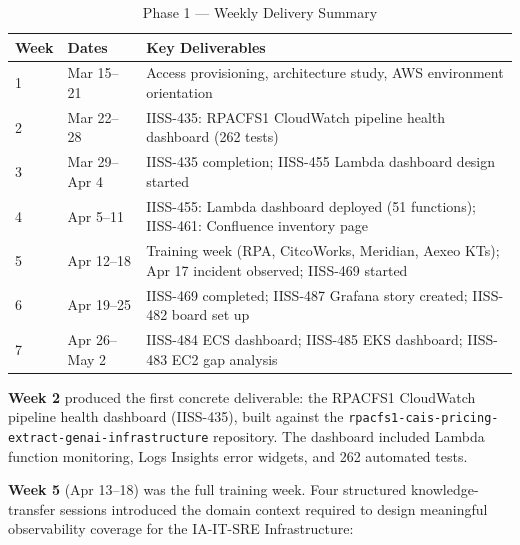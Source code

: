 \begin{table}[ht]
\centering
\caption{Phase 1 --- Weekly Delivery Summary}
\label{tab:wb_phase1}
\begin{tabular}{p{1.2cm}p{4.0cm}p{7.5cm}}
\toprule
\textbf{Week} & \textbf{Dates} & \textbf{Key Deliverables} \\
\midrule
1 & Mar 15--21 & Access provisioning, architecture study, AWS environment orientation \\
2 & Mar 22--28 & IISS-435: RPACFS1 CloudWatch pipeline health dashboard (262 tests) \\
3 & Mar 29--Apr 4 & IISS-435 completion; IISS-455 Lambda dashboard design started \\
4 & Apr 5--11 & IISS-455: Lambda dashboard deployed (51 functions); IISS-461: Confluence inventory page \\
5 & Apr 12--18 & Training week (RPA, CitcoWorks, Meridian, Aexeo KTs); Apr 17 incident observed; IISS-469 started \\
6 & Apr 19--25 & IISS-469 completed; IISS-487 Grafana story created; IISS-482 board set up \\
7 & Apr 26--May 2 & IISS-484 ECS dashboard; IISS-485 EKS dashboard; IISS-483 EC2 gap analysis \\
\bottomrule
\end{tabular}
\end{table}

\textbf{Week 2} produced the first concrete deliverable: the RPACFS1
CloudWatch pipeline health dashboard (IISS-435), built against the
\texttt{rpacfs1-cais-pricing-extract-genai-infrastructure} repository. The
dashboard included Lambda function monitoring, Logs Insights error widgets,
and 262 automated tests.

\textbf{Week 5} (Apr 13--18) was the full training week. Four structured
knowledge-transfer sessions introduced the domain context required to design
meaningful observability coverage for the IA-IT-SRE Infrastructure:

